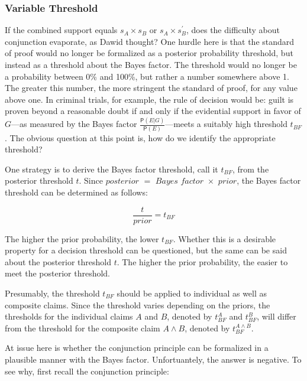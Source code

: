 \documentclass[10pt,dvipsnames,enabledeprecatedfontcommands]{scrartcl}
\newcommand{\pr}[1]{\mathsf{P}(#1)}
\begin{document}
\hypertarget{variable-threshold}{%
\subsubsection{Variable Threshold}\label{variable-threshold}}

If the combined support equals \(s_{A}\times s_{B}\) or
\(s_{A}\times s^{'}_{B}\), does the difficulty about conjunction
evaporate, as Dawid thought? One hurdle here is that the standard of
proof would no longer be formalized as a posterior probability
threshold, but instead as a threshold about the Bayes factor. The
threshold would no longer be a probability between 0\% and 100\%, but
rather a number somewhere above 1. The greater this number, the more
stringent the standard of proof, for any value above one. In criminal
trials, for example, the rule of decision would be: guilt is proven
beyond a reasonable doubt if and only if the evidential support in favor
of \(G\)---as measured by the Bayes factor
\(\frac{\pr{E | G}}{\pr{E}}\)---meets a suitably high threshold
\(t_{BF}\). The obvious question at this point is, how do we identify
the appropriate
threshold?

One strategy is to derive the Bayes factor threshold, call it
\(t_{BF}\), from the posterior threshold \(t\). Since
\(\textit{posterior }=\textit{ Bayes factor }\times \textit{ prior}\),
the Bayes factor threshold can be determined as follows:

\[\frac{t}{\textit{prior}}=t_{BF}\]

\noindent The higher the prior probability, the lower \(t_{BF}\).
Whether this is a desirable property for a decision threshold can be
questioned, but the same can be said about the posterior threshold
\(t\). The higher the prior probability, the easier to meet the
posterior threshold.

Presumably, the threshold \(t_{BF}\) should be applied to individual as
well as composite claims. Since the threshold varies depending on the
priors, the thresholds for the individual claims \(A\) and \(B\),
denoted by \(t_{BF}^A\) and \(t_{BF}^B\), will differ from the threshold
for the composite claim \(A \wedge B\), denoted by
\(t_{BF}^{A\wedge B}\).

At issue here is whether the conjunction principle can be formalized in
a plausible manner with the Bayes factor. Unfortuantely, the answer is
negative. To see why, first recall the conjunction principle:
\end{document}
